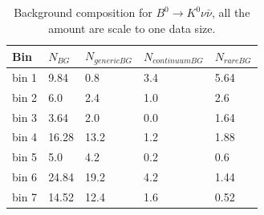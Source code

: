 \begin{table}[h]
\small
\begin{center}
\begin{tabu}to \textwidth{ |X[l]|X[c]|X[c]|X[c]|X[c]| }
\hline
 Bin & $N_{BG}$ &$N_{generic BG}$ & $N_{continuum BG}$ & $N_{rare BG}$   \\
 \hline
 bin 1  & 9.84  &0.8 &3.4&5.64\\ 
 \hline
 bin 2  & 6.0  	&2.4 &1.0&2.6\\ 
 \hline
 bin 3  & 3.64  &2.0 &0.0&1.64\\ 
 \hline
 bin 4  & 16.28 &13.2&1.2&1.88 \\ 
 \hline
 bin 5  & 5.0   &4.2 &0.2&0.6 \\ 
 \hline
 bin 6  & 24.84 &19.2&4.2&1.44 \\
 \hline
 bin 7  & 14.52 &12.4&1.6&0.52 \\ 
 \hline
 \hline
\end{tabu}
\caption{Background composition for $B^0 \rightarrow K^0 \nu \bar{\nu}$, all the amount are scale to one data size.} \label{t:bgcomk0}
\end{center}
\end{table}


